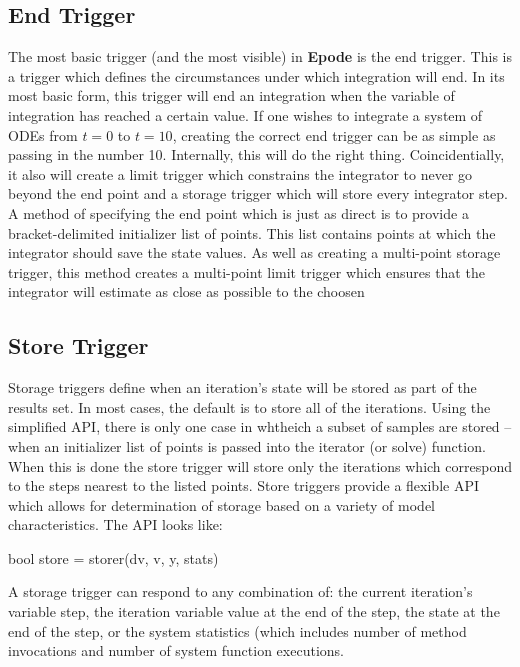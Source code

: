 \documentclass[letterpaper,10pt]{book}
\newcommand{\epode}[0]{\textbf{Epode}}
\begin{document}
      \subsection{End Trigger}
	The most basic trigger (and the most visible) in \epode{} is the end trigger.  This is a trigger which defines the circumstances under which integration will end.  In its most basic form, this trigger will end an integration when the variable of integration has reached a certain value.  If one wishes to integrate a system of ODEs from $t=0$ to $t=10$, creating the correct end trigger can be as simple as passing in the number 10.  Internally, this will do the right thing.  Coincidentially, it also will create a limit trigger which constrains the integrator to never go beyond the end point and a storage trigger which will store every integrator step.  A method of specifying the end point which is just as direct is to provide a bracket-delimited initializer list of points.  This list contains points at which the integrator should save the state values.  As well as creating a multi-point storage trigger, this method creates a multi-point limit trigger which ensures that the integrator will estimate as close as possible to the choosen  
    
      \subsection{Store Trigger}
	Storage triggers define when an iteration's state will be stored as part of the results set.  In most cases, the default is to store all of the iterations.  Using the simplified API, there is only one case in whtheich a subset of samples are stored -- when an initializer list of points is passed into the iterator (or solve) function.  When this is done the store trigger will store only the iterations which correspond to the steps nearest to the listed points.  Store triggers provide a flexible API which allows for determination of storage based on a variety of model characteristics.  The API looks like:
	\begin{epodecode}
	  bool store = storer(dv, v, y, stats)
	\end{epodecode}
	A storage trigger can respond to any combination of: the current iteration's variable step, the iteration variable value at the end of the step, the state at the end of the step, or the system statistics (which includes number of method invocations and number of system function executions.
	
\end{document}
